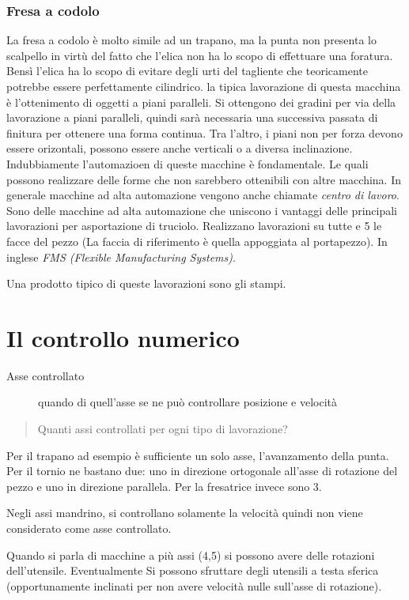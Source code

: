 \subsubsection{Fresa a codolo}
La fresa a codolo è molto simile ad un trapano, ma la punta non presenta lo scalpello in virtù del fatto che
l'elica non ha lo scopo di effettuare una foratura. Bensì l'elica ha lo scopo di evitare degli urti
del tagliente che teoricamente potrebbe essere perfettamente cilindrico.
la tipica lavorazione di questa macchina è l'ottenimento di oggetti a piani paralleli.
Si ottengono dei gradini per via della lavorazione a piani paralleli, quindi sarà necessaria una successiva 
passata di finitura per ottenere una forma continua.
Tra l'altro, i piani non per forza devono essere orizontali, possono essere anche verticali o a diversa 
inclinazione.
Indubbiamente l'automazioen di queste macchine è fondamentale. Le quali possono realizzare delle forme che
non sarebbero ottenibili con altre macchina.
In generale macchine ad alta automazione vengono anche chiamate \emph{centro di lavoro}.
Sono delle macchine ad alta automazione che uniscono i vantaggi delle principali lavorazioni per asportazione
di truciolo.
Realizzano lavorazioni su tutte e 5 le facce del pezzo (La faccia di riferimento è quella appoggiata al 
portapezzo). In inglese \emph{FMS (Flexible Manufacturing Systems)}.

Una prodotto tipico di queste lavorazioni sono gli stampi.

\section*{Il controllo numerico}
\begin{description}
\item[Asse controllato] quando di quell'asse se ne può controllare posizione e velocità
\end{description}

\begin{quote}
Quanti assi controllati per ogni tipo di lavorazione?
\end{quote}

Per il trapano ad esempio è sufficiente un solo asse, l'avanzamento della punta.
Per il tornio ne bastano due: uno in direzione ortogonale all'asse di rotazione del pezzo e uno in direzione 
parallela.
Per la fresatrice invece sono 3.

Negli assi mandrino, si controllano solamente la velocità quindi non viene considerato come asse controllato.

Quando si parla di macchine a più assi (4,5) si possono avere delle rotazioni dell'utensile.
Eventualmente Si possono sfruttare degli utensili a testa sferica (opportunamente inclinati per non avere 
velocità nulle sull'asse di rotazione).